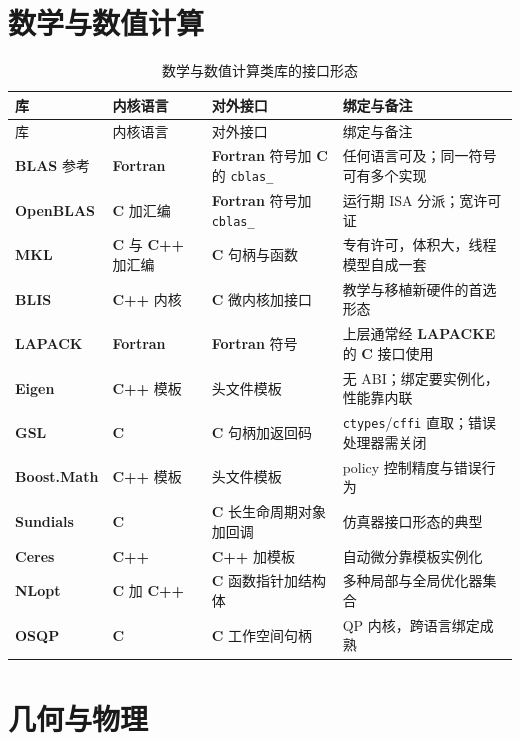 \documentclass[12pt,a4paper,fontset=fandol]{ctexbook}
\newcommand{\Tp}[1]{\texttt{#1}}
\newcommand{\Bk}{\allowbreak}
\newcommand{\Lib}[1]{\textbf{#1}}
\newcommand{\Lang}[1]{\textsf{\bfseries #1}}
\newcommand{\CL}{\Lang{C}}
\newcommand{\CPP}{\Lang{C++}}
\newcommand{\FTN}{\Lang{Fortran}}
\begin{document}
\section{数学与数值计算}

\begin{longtable}{@{}>{\raggedright\arraybackslash}p{}
  >{\raggedright\arraybackslash}p{}
  >{\raggedright\arraybackslash}p{}
  >{\raggedright\arraybackslash}p{}@{}}
\caption{数学与数值计算类库的接口形态}\label{tab:apA-math}\\
\toprule
库 & 内核语言 & 对外接口 & 绑定与备注 \\
\midrule
\endfirsthead
\toprule
库 & 内核语言 & 对外接口 & 绑定与备注 \\
\midrule
\endhead
\Lib{BLAS} 参考 & \FTN{} & \FTN{} 符号加 \CL{} 的 \Tp{cblas\_} &
  任何语言可及；同一符号可有多个实现 \\
\Lib{OpenBLAS} & \CL{} 加汇编 & \FTN{} 符号加 \Tp{cblas\_} &
  运行期 ISA 分派；宽许可证 \\
\Lib{MKL} & \CL{} 与 \CPP{} 加汇编 & \CL{} 句柄与函数 &
  专有许可，体积大，线程模型自成一套 \\
\Lib{BLIS} & \CPP{} 内核 & \CL{} 微内核加接口 &
  教学与移植新硬件的首选形态 \\
\Lib{LAPACK} & \FTN{} & \FTN{} 符号 &
  上层通常经 \Lib{LAPACKE} 的 \CL{} 接口使用 \\
\Lib{Eigen} & \CPP{} 模板 & 头文件模板 &
  无 ABI；绑定要实例化，性能靠内联 \\
\Lib{GSL} & \CL{} & \CL{} 句柄加返回码 &
  \Tp{ctypes}/{\Bk}\Tp{cffi} 直取；错误处理器需关闭 \\
\Lib{Boost.Math} & \CPP{} 模板 & 头文件模板 &
  policy 控制精度与错误行为 \\
\Lib{Sundials} & \CL{} & \CL{} 长生命周期对象加回调 &
  仿真器接口形态的典型 \\
\Lib{Ceres} & \CPP{} & \CPP{} 加模板 &
  自动微分靠模板实例化 \\
\Lib{NLopt} & \CL{} 加 \CPP{} & \CL{} 函数指针加结构体 &
  多种局部与全局优化器集合 \\
\Lib{OSQP} & \CL{} & \CL{} 工作空间句柄 &
  QP 内核，跨语言绑定成熟 \\
\end{longtable}

\section{几何与物理}
\end{document}
